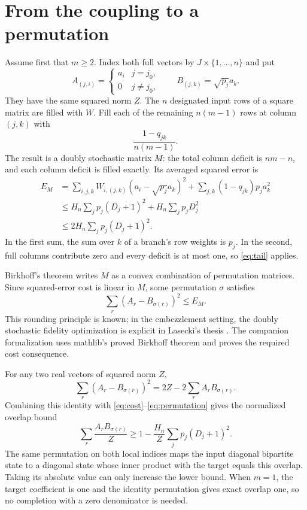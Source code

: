 \documentclass[11pt]{article}
\begin{document}
\section{From the coupling to a permutation}

Assume first that $m\geq2$. Index both full vectors by $J\times\{1,\ldots,n\}$ and put
\[
 A_{(j,i)}=\begin{cases}a_i&j=j_0,\\0&j\ne j_0,\end{cases}
 \qquad B_{(j,k)}=\sqrt{p_j}a_k.
\]
They have the same squared norm $Z$. The $n$ designated input rows of a square matrix are filled with $W$. Fill each of the remaining $n(m-1)$ rows at column $(j,k)$ with
\[
 \frac{1-q_{jk}}{n(m-1)}.
\]
The result is a doubly stochastic matrix $M$: the total column deficit is $nm-n$, and each column deficit is filled exactly. Its averaged squared error is
\begin{align}
 E_M&=\sum_{i,j,k}W_{i,(j,k)}(a_i-\sqrt{p_j}a_k)^2
       +\sum_{j,k}(1-q_{jk})p_ja_k^2\\
 &\leq H_n\sum_jp_j(D_j+1)^2+H_n\sum_jp_jD_j^2\\
 &\leq2H_n\sum_jp_j(D_j+1)^2.\label{eq:cost}
\end{align}
In the first sum, the sum over $k$ of a branch's row weights is $p_j$. In the second, full columns contribute zero and every deficit is at most one, so \eqref{eq:tail} applies.

Birkhoff's theorem writes $M$ as a convex combination of permutation matrices. Since squared-error cost is linear in $M$, some permutation $\sigma$ satisfies
\begin{equation}
 \sum_r(A_r-B_{\sigma(r)})^2\leq E_M.\label{eq:permutation}
\end{equation}
This rounding principle is known; in the embezzlement setting, the doubly stochastic fidelity optimization is explicit in Lasecki's thesis \cite{lasecki}. The companion formalization uses mathlib's proved Birkhoff theorem and proves the required cost consequence.

For any two real vectors of squared norm $Z$,
\[
 \sum_r(A_r-B_{\sigma(r)})^2=2Z-2\sum_rA_rB_{\sigma(r)}.
\]
Combining this identity with \eqref{eq:cost}--\eqref{eq:permutation} gives the normalized overlap bound
\begin{equation}
 \sum_r\frac{A_rB_{\sigma(r)}}Z
 \geq1-\frac{H_n}{Z}\sum_jp_j(D_j+1)^2.
 \label{eq:overlap}
\end{equation}
The same permutation on both local indices maps the input diagonal bipartite state to a diagonal state whose inner product with the target equals this overlap. Taking its absolute value can only increase the lower bound. When $m=1$, the target coefficient is one and the identity permutation gives exact overlap one, so no completion with a zero denominator is needed.
\end{document}
